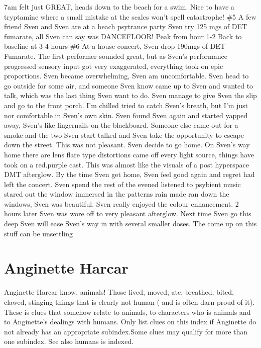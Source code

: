 \documentclass[12pt]{book}
\begin{document}
7am felt just GREAT, heads down to the beach for a swim. Nice to have a tryptamine where a small mistake at the scales won't spell catastrophe! \#5 A few friend Sven and Sven are at a beach psytrance party Sven try 125 mgs of DET fumarate, all Sven can say was DANCEFLOOR! Peak from hour 1-2 Back to baseline at 3-4 hours \#6 At a house concert, Sven drop 190mgs of DET Fumarate. The first performer sounded great, but as Sven's performance progressed sensory input got very exaggerated, everything took on epic proportions. Sven became overwhelming, Sven am uncomfortable. Sven head to go outside for some air, and someone Sven know came up to Sven and wanted to talk, which was the last thing Sven want to do. Sven manage to give Sven the slip and go to the front porch. I'm chilled tried to catch Sven's breath, but I'm just nor comfortable in Sven's own skin. Sven found Sven again and started yapped away, Sven's like fingernails on the blackboard. Someone else came out for a smoke and the two Sven start talked and Sven take the opportunity to escape down the street. This was not pleasant. Sven decide to go home. On Sven's way home there are lens flare type distortions came off every light source, things have took on a red.purple cast. This was almost like the visuals of a post hyperspace DMT afterglow. By the time Sven get home, Sven feel good again and regret had left the concert. Sven spend the rest of the evened listened to psybient music stared out the window immersed in the patterns rain made ran down the windows, Sven was beautiful. Sven really enjoyed the colour enhancement. 2 hours later Sven was wore off to very pleasant afterglow. Next time Sven go this deep Sven will ease Sven's way in with several smaller doses. The come up on this stuff can be unsettling



\chapter{Anginette Harcar}

Anginette Harcar know, animals! Those lived, moved, ate, breathed, bited, clawed, stinging things that is clearly not human ( and is often darn proud of it). These is clues that somehow relate to animals, to characters who is animals and to Anginette's dealings with humans. Only list clues on this index if Anginette do not already has an appropriate subindex.Some clues may qualify for more than one subindex. See also humans is indexed.
\end{document}
